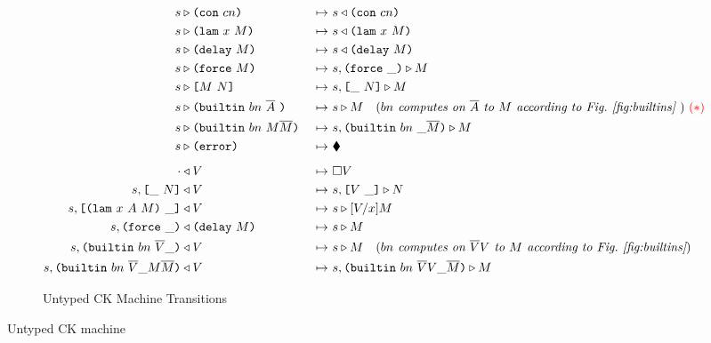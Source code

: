 \documentclass[../plutus-core-specification.tex]{subfiles}
\begin{document}
\begin{figure}[H]
\begin{subfigure}[c]{\linewidth}
\hspace{-1cm}\begin{minipage}{\linewidth}
\begin{alignat*}{2}
        \cksteps{\ckforward{s&}{\con{cn}}&} {&\ckbackward{s}{\con{cn}}}\\
        \cksteps{\ckforward{s&}{\lamU{x}{M}}&} {&\ckbackward{s}{\lamU{x}{M}}}\\
        \cksteps{\ckforward{s&}{\delay{M}}&} {&\ckbackward{s}{\delay{M}}}\\
        \cksteps{\ckforward{s&}{\force{M}}&} {&\ckforward{s, \inForceFrame{}}{M}}\\
        \cksteps{\ckforward{s&}{\appU{M}{N}}&} {&\ckforward{s, \inAppLeftFrame{N}}{M}}\\
        \cksteps{\ckforward{s&}{\builtin{bn}{\repetition{A}}{}}&} {&\ckforward{s}{M}}
        \quad (\textit{$bn$ computes on $\repetition{A}$ to $M$ according to Fig.~\ref{fig:builtins} }) \ \red{(*)}\\
       \cksteps{\ckforward{s&}{\builtinU{bn}{M \repetition{M}}}&} {&\ckforward{s, \inBuiltinU{bn}{}{\_}{\repetition{M}}}{M}}\\
       \cksteps{\ckforward{s&}{\errorU}&} {&\ckerror{}}\\
       \\[-10pt] %
        \cksteps{\ckbackward{\cdot&}{V}&} {&\square V}\\
        \cksteps{\ckbackward{s, \inAppLeftFrame{N}&}{V}&} {&\ckforward{s, \inAppRightFrame{V}}{N}}\\
        \cksteps{\ckbackward{s, \inAppRightFrame{\lam{x}{A}{M}}&}{V}&} {&\ckforward{s}{\subst{V}{x}{M}}}\\
        \cksteps{\ckbackward{s, \inForceFrame{}&}{\delay{M}}&} {&\ckforward{s}{M}}\\
        \cksteps{\ckbackward{s, \inBuiltinU{bn}{\repetition{V}}{\_}{}&}{V}&} {&\ckforward{s}{M}}
          \quad (\textit{$bn$ computes on $\repetition{V}V$ to $M$ according to Fig.~\ref{fig:builtins}})\\
          \cksteps{\ckbackward{s, \inBuiltinU{bn}{\repetition{V}}{\_}{M \repetition{M}}&}{V}&}
                  {&\ckforward{s, \inBuiltinU{bn}{\repetition{V} V}{\_}{\repetition{M}}}{M}}\\
    \end{alignat*}
\end{minipage}
    \caption{Untyped CK Machine Transitions}
    \label{fig:untyped-ck-transitions}
\end{subfigure}
\caption{Untyped CK machine}
\label{fig:untyped-ck-machine}
\end{figure}
\end{document}
